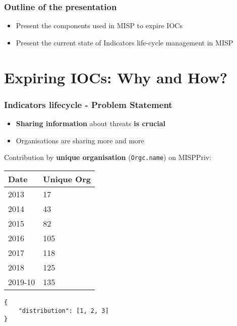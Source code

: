 
\begin{frame}[t,plain]
\titlepage
\end{frame}

\begin{frame}
    \frametitle{Outline of the presentation}
    \begin{itemize}
        \item Present the components used in MISP to expire IOCs
        \item Present the current state of Indicators life-cycle management in MISP
    \end{itemize}
\end{frame}

\section{Expiring IOCs: Why and How?}
\begin{frame}[fragile]
\frametitle{Indicators lifecycle - Problem Statement}
    \begin{itemize}
        \item {\bf Sharing information} about threats {\bf is crucial}
        \item Organisations are sharing more and more
    \end{itemize}
    \vspace{1em}

    Contribution by {\bf unique organisation} (\texttt{Orgc.name}) on MISPPriv:\\
    \vspace{1em}
    \begin{minipage}{0.45\textwidth}
        \begin{tabular}{ll}
            \hline
            Date  & Unique Org \\
            \hline
            2013  & 17 \\
            2014  & 43 \\
            2015  & 82 \\
            2016  & 105 \\
            2017  & 118 \\
            2018  & 125 \\
            2019-10 & 135 \\
            \hline
        \end{tabular}
        \vspace{0.5em}
    \end{minipage}
    \begin{minipage}{0.5\textwidth}
        \begin{lstlisting}
{
    "distribution": [1, 2, 3]
}\end{lstlisting}
    \end{minipage}

\end{frame}

